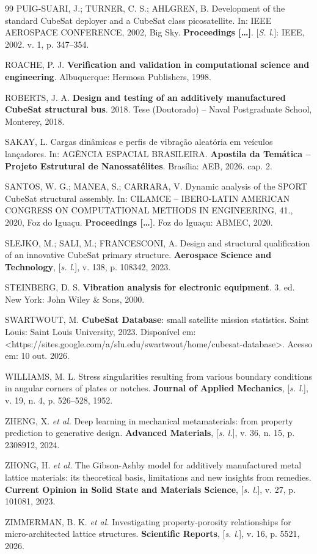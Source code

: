 \begin{thebibliography}{99}
PUIG-SUARI, J.; TURNER, C. S.; AHLGREN, B. Development of the standard CubeSat deployer and a CubeSat class picosatellite. In: IEEE AEROSPACE CONFERENCE, 2002, Big Sky. \textbf{Proceedings [\ldots]}. [\textit{S. l.}]: IEEE, 2002. v. 1, p. 347--354.

ROACHE, P. J. \textbf{Verification and validation in computational science and engineering}. Albuquerque: Hermosa Publishers, 1998.

ROBERTS, J. A. \textbf{Design and testing of an additively manufactured CubeSat structural bus}. 2018. Tese (Doutorado) -- Naval Postgraduate School, Monterey, 2018.

SAKAY, L. Cargas dinâmicas e perfis de vibração aleatória em veículos lançadores. In: AGÊNCIA ESPACIAL BRASILEIRA. \textbf{Apostila da Temática -- Projeto Estrutural de Nanossatélites}. Brasília: AEB, 2026. cap. 2.

SANTOS, W. G.; MANEA, S.; CARRARA, V. Dynamic analysis of the SPORT CubeSat structural assembly. In: CILAMCE -- IBERO-LATIN AMERICAN CONGRESS ON COMPUTATIONAL METHODS IN ENGINEERING, 41., 2020, Foz do Iguaçu. \textbf{Proceedings [\ldots]}. Foz do Iguaçu: ABMEC, 2020.

SLEJKO, M.; SALI, M.; FRANCESCONI, A. Design and structural qualification of an innovative CubeSat primary structure. \textbf{Aerospace Science and Technology}, [\textit{s. l.}], v. 138, p. 108342, 2023.

STEINBERG, D. S. \textbf{Vibration analysis for electronic equipment}. 3. ed. New York: John Wiley \& Sons, 2000.

SWARTWOUT, M. \textbf{CubeSat Database}: small satellite mission statistics. Saint Louis: Saint Louis University, 2023. Disponível em: <https://sites.google.com/a/slu.edu/swartwout/home/cubesat-database>. Acesso em: 10 out. 2026.

WILLIAMS, M. L. Stress singularities resulting from various boundary conditions in angular corners of plates or notches. \textbf{Journal of Applied Mechanics}, [\textit{s. l.}], v. 19, n. 4, p. 526--528, 1952.

ZHENG, X. \textit{et al.} Deep learning in mechanical metamaterials: from property prediction to generative design. \textbf{Advanced Materials}, [\textit{s. l.}], v. 36, n. 15, p. 2308912, 2024.

ZHONG, H. \textit{et al.} The Gibson-Ashby model for additively manufactured metal lattice materials: its theoretical basis, limitations and new insights from remedies. \textbf{Current Opinion in Solid State and Materials Science}, [\textit{s. l.}], v. 27, p. 101081, 2023.

ZIMMERMAN, B. K. \textit{et al.} Investigating property-porosity relationships for micro-architected lattice structures. \textbf{Scientific Reports}, [\textit{s. l.}], v. 16, p. 5521, 2026.

\end{thebibliography}
